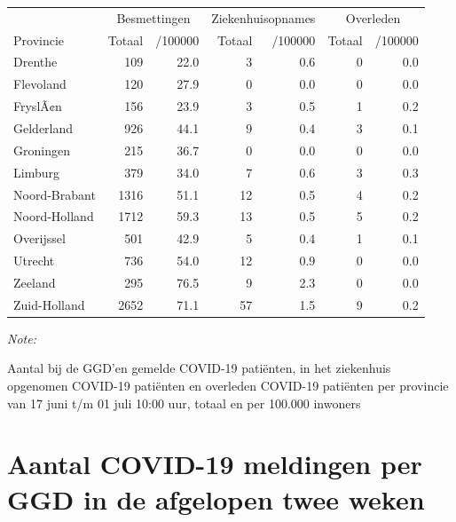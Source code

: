 \documentclass[
  english,
  man,floatsintext]{apa6}
\begin{document}
\begin{table}
\centering
\begin{threeparttable}
\begin{tabular}{lrrrrrr}
\toprule
\multicolumn{1}{c}{ } & \multicolumn{2}{c}{Besmettingen} & \multicolumn{2}{c}{Ziekenhuisopnames} & \multicolumn{2}{c}{Overleden} \\
\cmidrule(l{3pt}r{3pt}){2-3} \cmidrule(l{3pt}r{3pt}){4-5} \cmidrule(l{3pt}r{3pt}){6-7}
Provincie & Totaal & /100000 & Totaal & /100000 & Totaal & /100000\\
\midrule
Drenthe & 109 & 22.0 & 3 & 0.6 & 0 & 0.0\\
Flevoland & 120 & 27.9 & 0 & 0.0 & 0 & 0.0\\
FryslÃ¢n & 156 & 23.9 & 3 & 0.5 & 1 & 0.2\\
Gelderland & 926 & 44.1 & 9 & 0.4 & 3 & 0.1\\
Groningen & 215 & 36.7 & 0 & 0.0 & 0 & 0.0\\
Limburg & 379 & 34.0 & 7 & 0.6 & 3 & 0.3\\
Noord-Brabant & 1316 & 51.1 & 12 & 0.5 & 4 & 0.2\\
Noord-Holland & 1712 & 59.3 & 13 & 0.5 & 5 & 0.2\\
Overijssel & 501 & 42.9 & 5 & 0.4 & 1 & 0.1\\
Utrecht & 736 & 54.0 & 12 & 0.9 & 0 & 0.0\\
Zeeland & 295 & 76.5 & 9 & 2.3 & 0 & 0.0\\
Zuid-Holland & 2652 & 71.1 & 57 & 1.5 & 9 & 0.2\\
\bottomrule
\end{tabular}
\begin{tablenotes}
\item \textit{Note: } 
\item Aantal bij de GGD’en gemelde COVID-19 patiënten, in het ziekenhuis opgenomen COVID-19 patiënten en overleden COVID-19 patiënten per provincie van 17 juni t/m 01 juli 10:00 uur, totaal en per 100.000 inwoners
\end{tablenotes}
\end{threeparttable}
\end{table}

\newpage

\hypertarget{aantal-covid-19-meldingen-per-ggd-in-de-afgelopen-twee-weken}{%
\section{Aantal COVID-19 meldingen per GGD in de afgelopen twee weken}\label{aantal-covid-19-meldingen-per-ggd-in-de-afgelopen-twee-weken}}
\end{document}

